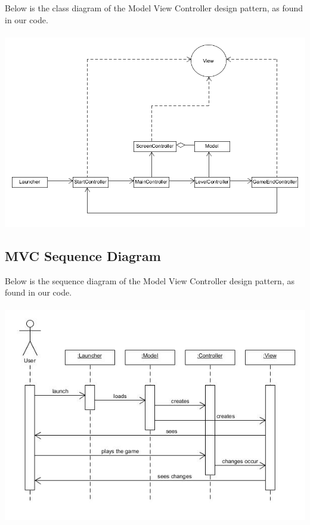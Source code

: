 Below is the class diagram of the Model View Controller design pattern, as found in our code.
\\\\
\includegraphics[width=150mm]{UML_MVC.png}

\subsection{MVC Sequence Diagram}

Below is the sequence diagram of the Model View Controller design pattern, as found in our code.
\\\\
\includegraphics[width=150mm]{MVC_sequence.jpg}